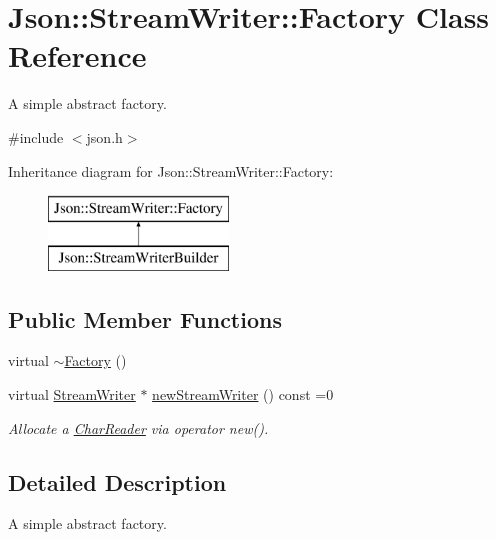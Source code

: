 \hypertarget{classJson_1_1StreamWriter_1_1Factory}{}\section{Json\+:\+:Stream\+Writer\+:\+:Factory Class Reference}
\label{classJson_1_1StreamWriter_1_1Factory}


A simple abstract factory.  




{\ttfamily \#include $<$json.\+h$>$}

Inheritance diagram for Json\+:\+:Stream\+Writer\+:\+:Factory\+:\begin{figure}[H]
\begin{center}
\leavevmode
\includegraphics[height=2.000000cm]{classJson_1_1StreamWriter_1_1Factory}
\end{center}
\end{figure}
\subsection*{Public Member Functions}
\begin{DoxyCompactItemize}
\item 
virtual \hyperlink{classJson_1_1StreamWriter_1_1Factory_ad334ad5e81e3b9b1768620a446366ff1_ad334ad5e81e3b9b1768620a446366ff1}{$\sim$\+Factory} ()
\item 
virtual \hyperlink{classJson_1_1StreamWriter}{Stream\+Writer} $\ast$ \hyperlink{classJson_1_1StreamWriter_1_1Factory_a9d30ec53e8288cd53befccf1009c5f31_a9d30ec53e8288cd53befccf1009c5f31}{new\+Stream\+Writer} () const =0
\begin{DoxyCompactList}\small\item\em Allocate a \hyperlink{classJson_1_1CharReader}{Char\+Reader} via operator new(). \end{DoxyCompactList}\end{DoxyCompactItemize}


\subsection{Detailed Description}
A simple abstract factory. 

